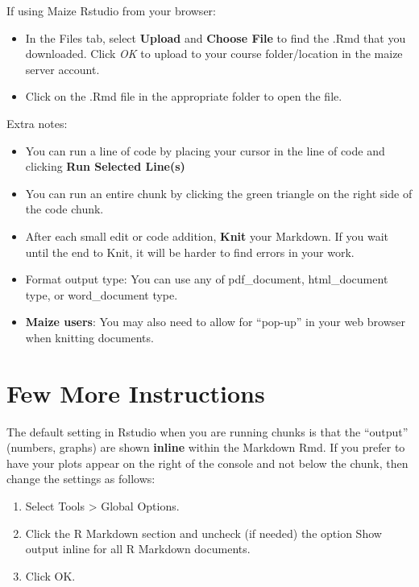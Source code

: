 \documentclass[
]{book}
\providecommand{\tightlist}{%
  \setlength{\itemsep}{0pt}\setlength{\parskip}{0pt}}
\begin{document}
If using Maize Rstudio from your browser:

\begin{itemize}
\item
  In the Files tab, select \textbf{Upload} and \textbf{Choose File} to find the .Rmd that you downloaded. Click \emph{OK} to upload to your course folder/location in the maize server account.
\item
  Click on the .Rmd file in the appropriate folder to open the file.
\end{itemize}

Extra notes:

\begin{itemize}
\item
  You can run a line of code by placing your cursor in the line of code and clicking \textbf{Run Selected Line(s)}
\item
  You can run an entire chunk by clicking the green triangle on the right side of the code chunk.
\item
  After each small edit or code addition, \textbf{Knit} your Markdown. If you wait until the end to Knit, it will be harder to find errors in your work.
\item
  Format output type: You can use any of pdf\_document, html\_document type, or word\_document type.
\item
  \textbf{Maize users}: You may also need to allow for ``pop-up'' in your web browser when knitting documents.
\end{itemize}

\hypertarget{few-more-instructions}{%
\section{Few More Instructions}\label{few-more-instructions}}

The default setting in Rstudio when you are running chunks is that the ``output'' (numbers, graphs) are
shown \textbf{inline} within the Markdown Rmd. If you prefer to have your plots appear on the right of the console and not below the chunk, then change the settings as follows:

\begin{enumerate}
\def\labelenumi{\arabic{enumi}.}
\tightlist
\item
  Select Tools \textgreater{} Global Options.
\item
  Click the R Markdown section and uncheck (if needed) the option Show output inline for all
  R Markdown documents.
\item
  Click OK.
\end{enumerate}
\end{document}
